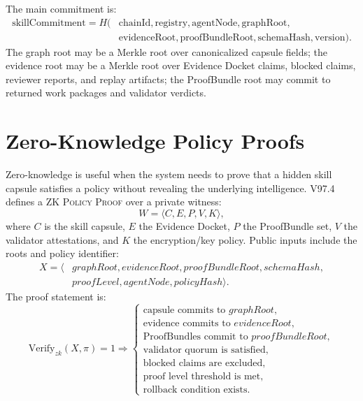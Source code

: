 \documentclass[11pt]{article}
\newcommand{\term}[1]{\textsc{#1}}
\begin{document}
The main commitment is:
\[
\begin{aligned}
\mathrm{skillCommitment}=H(&\mathrm{chainId},\mathrm{registry},\mathrm{agentNode},\mathrm{graphRoot},\\
&\mathrm{evidenceRoot},\mathrm{proofBundleRoot},\mathrm{schemaHash},\mathrm{version}).
\end{aligned}
\]
The graph root may be a Merkle root over canonicalized capsule fields; the evidence root may be a Merkle root over Evidence Docket claims, blocked claims, reviewer reports, and replay artifacts; the ProofBundle root may commit to returned work packages and validator verdicts.

\section{Zero-Knowledge Policy Proofs}
Zero-knowledge is useful when the system needs to prove that a hidden skill capsule satisfies a policy without revealing the underlying intelligence. V97.4 defines a \term{ZK Policy Proof} over a private witness:
\[
W=\langle C,E,P,V,K\rangle,
\]
where \(C\) is the skill capsule, \(E\) the Evidence Docket, \(P\) the ProofBundle set, \(V\) the validator attestations, and \(K\) the encryption/key policy. Public inputs include the roots and policy identifier:
\[
\begin{aligned}
X=\langle &graphRoot,evidenceRoot,proofBundleRoot,schemaHash,\\
&proofLevel,agentNode,policyHash\rangle.
\end{aligned}
\]
The proof statement is:
\[
\mathrm{Verify}_{zk}(X,\pi)=1 \Rightarrow
\begin{cases}
\text{capsule commits to } graphRoot,\\
\text{evidence commits to } evidenceRoot,\\
\text{ProofBundles commit to } proofBundleRoot,\\
\text{validator quorum is satisfied,}\\
\text{blocked claims are excluded,}\\
\text{proof level threshold is met,}\\
\text{rollback condition exists.}
\end{cases}
\]
\end{document}
